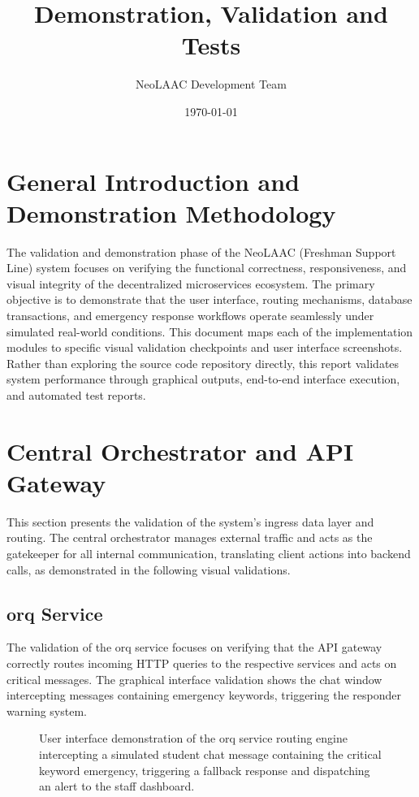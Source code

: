 \documentclass[12pt]{article}
\title{Demonstration, Validation and Tests}
\author{NeoLAAC Development Team}
\date{\today}
\begin{document}
\maketitle

\section{General Introduction and Demonstration Methodology}
The validation and demonstration phase of the NeoLAAC (Freshman Support Line) system focuses on verifying the functional correctness, responsiveness, and visual integrity of the decentralized microservices ecosystem. The primary objective is to demonstrate that the user interface, routing mechanisms, database transactions, and emergency response workflows operate seamlessly under simulated real-world conditions. This document maps each of the implementation modules to specific visual validation checkpoints and user interface screenshots. Rather than exploring the source code repository directly, this report validates system performance through graphical outputs, end-to-end interface execution, and automated test reports.

\section{Central Orchestrator and API Gateway}
This section presents the validation of the system's ingress data layer and routing. The central orchestrator manages external traffic and acts as the gatekeeper for all internal communication, translating client actions into backend calls, as demonstrated in the following visual validations.

\subsection{orq Service}
The validation of the orq service focuses on verifying that the API gateway correctly routes incoming HTTP queries to the respective services and acts on critical messages. The graphical interface validation shows the chat window intercepting messages containing emergency keywords, triggering the responder warning system.

\begin{figure}[htbp]
    \centering
    \caption{User interface demonstration of the orq service routing engine intercepting a simulated student chat message containing the critical keyword emergency, triggering a fallback response and dispatching an alert to the staff dashboard.}
    \label{fig:orq_chat_triage}
\end{figure}
\end{document}

